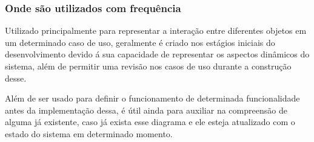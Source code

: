 \subsubsection{Onde são utilizados com frequência}
Utilizado principalmente para representar a interação entre diferentes objetos em um determinado caso de uso, geralmente é criado nos estágios iniciais do desenvolvimento devido á sua capacidade de representar os aspectos dinâmicos do sistema, além de permitir uma revisão nos casos de uso durante a construção desse.

Além de ser usado para definir o funcionamento de determinada funcionalidade antes da implementação dessa, é útil ainda para auxiliar na compreensão de alguma já existente, caso já exista esse diagrama e ele esteja atualizado com o estado do sistema em determinado momento.